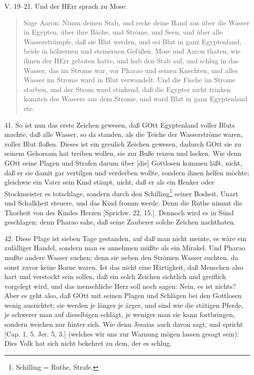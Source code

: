 \begin{schriftzitat}
V. 19–21. Und der HErr sprach zu Mose:
\end{schriftzitat}

\begin{quote}
Sage Aaron: Nimm deinen Stab, und recke deine Hand aus über die Wasser in Egypten, über ihre Bäche, und Ströme, und Seen, und über alle Wasserstrümpfe, daß sie Blut werden, und sei Blut in ganz Egyptenland, beide in hölzernen und steinernen Gefäßen. Mose und Aaron thaten, wie ihnen der HErr geboten hatte, und hub den Stab auf, und schlug in das Wasser, das im Strome war, vor Pharao und seinen Knechten, und alles Wasser im Strome ward in Blut verwandelt. Und die Fische im Strome starben, und der Strom ward stinkend, daß die Egypter nicht trinken konnten des Wassers aus dem Strome, und ward Blut in ganz Egyptenland etc.
\end{quote}

41. So ist nun das erste Zeichen gewesen, daß GOtt Egyptenland voller Bluts machte, daß alle Wasser, so da standen, als die Teiche der Wasserströme waren, voller Blut floßen. Dieses ist ein greulich Zeichen gewesen, dadurch GOtt sie zu seinem Gehorsam hat treiben wollen, sie zur Buße reizen und locken. Wie denn GOtt
seine Plagen und Strafen darum über [die] Gottlosen kommen läßt, nicht, daß er sie damit gar vertilgen und verderben wollte, sondern ihnen helfen möchte; gleichwie ein Vater sein Kind stäupt, nicht, daß er als ein Henker oder Stockmeister es totschlage, sondern durch den Schilling\footnote{Schilling = Ruthe, Strafe.} seiner Bosheit, Unart und Schalkheit steuere, und das Kind fromm werde. Denn die Ruthe nimmt die Thorheit von des Kindes Herzen [Sprichw. 22, 15.]. Dennoch wird es in Sünd geschlagen; denn Pharao sahe, daß seine Zauberer solche Zeichen nachthaten.

42. Diese Plage ist sieben Tage gestanden, auf daß man nicht meinte, es wäre ein zufälliger Handel, sondern man es annehmen müßte als ein Mirakel. Und Pharao mußte andere Wasser suchen; denn sie neben den Strömen Wasser suchten, da sonst zuvor keine Borne waren. Ist das nicht eine Härtigkeit, daß Menschen also hart und verstockt sein sollen, daß ein solch Zeichen sichtlich und greiflich vorgelegt wird, und das menschliche Herz soll noch sagen: Nein, es ist nichts? Aber es geht also, daß GOtt mit seinen Plagen und Schlägen bei den Gottlosen wenig ausrichtet; sie werden je länger je ärger, und sind wie die stätigen Pferde, je schwerer man auf dieselbigen schlägt, je weniger man sie kann fortbringen, sondern weichen nur hinter sich. Wie denn Jesaias auch davon sagt, und spricht [Cap. 1, 5. Jer. 5, 3.] (welches wir uns zur Warnung mögen lassen gesagt sein): Dies Volk hat sich nicht bekehret zu dem, der es schlug.

